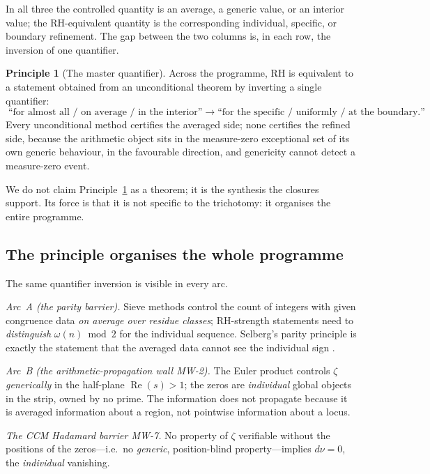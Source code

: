 \documentclass[11pt]{amsart}
\theoremstyle{definition}
\newtheorem{principle}[theorem]{Principle}
\theoremstyle{remark}
\newcommand{\dnu}{d\nu}
\DeclareMathOperator{\Real}{Re}
\begin{document}
In all three the controlled quantity is an average, a generic value, or an
interior value; the RH-equivalent quantity is the corresponding individual,
specific, or boundary refinement. The gap between the two columns is, in each
row, the inversion of one quantifier.

\begin{principle}[The master quantifier]\label{prin:master}
Across the programme, RH is equivalent to a statement obtained from an
unconditional theorem by inverting a single quantifier:
\[
\text{``for almost all / on average / in the interior''}
\;\longrightarrow\;
\text{``for the specific / uniformly / at the boundary.''}
\]
Every unconditional method certifies the averaged side; none certifies the
refined side, because the arithmetic object sits in the measure-zero
exceptional set of its own generic behaviour, in the favourable direction,
and genericity cannot detect a measure-zero event.
\end{principle}

We do not claim Principle~\ref{prin:master} as a theorem; it is the
synthesis the closures support. Its force is that it is not specific to the
trichotomy: it organises the entire programme.

\subsection{The principle organises the whole programme}
The same quantifier inversion is visible in every arc.

\emph{Arc~A (the parity barrier).} Sieve methods control the count of
integers with given congruence data \emph{on average over residue classes};
RH-strength statements need to \emph{distinguish} $\omega(n)\bmod2$ for the
individual sequence. Selberg's parity principle is exactly the statement that
the averaged data cannot see the individual sign \cite[Arc~A]{P40}.

\emph{Arc~B (the arithmetic-propagation wall MW-2).} The Euler product
controls $\zeta$ \emph{generically} in the half-plane $\Real(s)>1$; the zeros
are \emph{individual} global objects in the strip, owned by no prime. The
information does not propagate because it is averaged information about a
region, not pointwise information about a locus.

\emph{The CCM Hadamard barrier MW-7.} No property of $\zeta$ verifiable
without the positions of the zeros---i.e.\ no \emph{generic}, position-blind
property---implies $\dnu=0$, the \emph{individual} vanishing.
\end{document}
